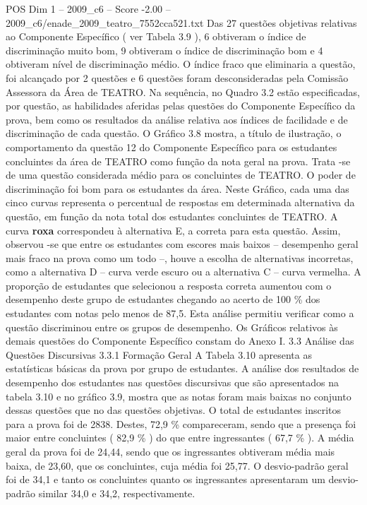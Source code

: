 \begin{textsample}{POS Dim 1 – 2009\_c6 – Score -2.00 – 2009\_c6/enade\_2009\_teatro\_7552cca521.txt}
Das 27 questões objetivas relativas ao Componente Específico ( ver Tabela 3.9 ), 6 obtiveram o índice de discriminação muito bom, 9 obtiveram o índice de discriminação bom e 4 obtiveram nível de discriminação médio.
O índice fraco que eliminaria a questão, foi alcançado por 2 questões e 6 questões foram desconsideradas pela Comissão Assessora da Área de TEATRO.
Na sequência, no Quadro 3.2 estão especificadas, por questão, as habilidades aferidas pelas questões do Componente Específico da prova, bem como os resultados da análise relativa aos índices de facilidade e de discriminação de cada questão.
O Gráfico 3.8 mostra, a título de ilustração, o comportamento da questão 12 do Componente Específico para os estudantes concluintes da área de TEATRO como função da nota geral na prova.
Trata -se de uma questão considerada médio para os concluintes de TEATRO.
O poder de discriminação foi bom para os estudantes da área.
Neste Gráfico, cada uma das cinco curvas representa o percentual de respostas em determinada alternativa da questão, em função da nota total dos estudantes concluintes de TEATRO.
A curva \textbf{roxa} correspondeu à alternativa E, a correta para esta questão.
Assim, observou -se que entre os estudantes com escores mais baixos – desempenho geral mais fraco na prova como um todo –, houve a escolha de alternativas incorretas, como a alternativa D – curva verde escuro ou a alternativa C – curva vermelha.
A proporção de estudantes que selecionou a resposta correta aumentou com o desempenho deste grupo de estudantes chegando ao acerto de 100 \% dos estudantes com notas pelo menos de 87,5.
Esta análise permitiu verificar como a questão discriminou entre os grupos de desempenho.
Os Gráficos relativos às demais questões do Componente Específico constam do Anexo I. 3.3 Análise das Questões Discursivas 3.3.1 Formação Geral A Tabela 3.10 apresenta as estatísticas básicas da prova por grupo de estudantes.
A análise dos resultados de desempenho dos estudantes nas questões discursivas que são apresentados na tabela 3.10 e no gráfico 3.9, mostra que as notas foram mais baixas no conjunto dessas questões que no das questões objetivas.
O total de estudantes inscritos para a prova foi de 2838.
Destes, 72,9 \% compareceram, sendo que a presença foi maior entre concluintes ( 82,9 \% ) do que entre ingressantes ( 67,7 \% ).
A média geral da prova foi de 24,44, sendo que os ingressantes obtiveram média mais baixa, de 23,60, que os concluintes, cuja média foi 25,77.
O desvio-padrão geral foi de 34,1 e tanto os concluintes quanto os ingressantes apresentaram um desvio-padrão similar 34,0 e 34,2, respectivamente.

\end{textsample}
